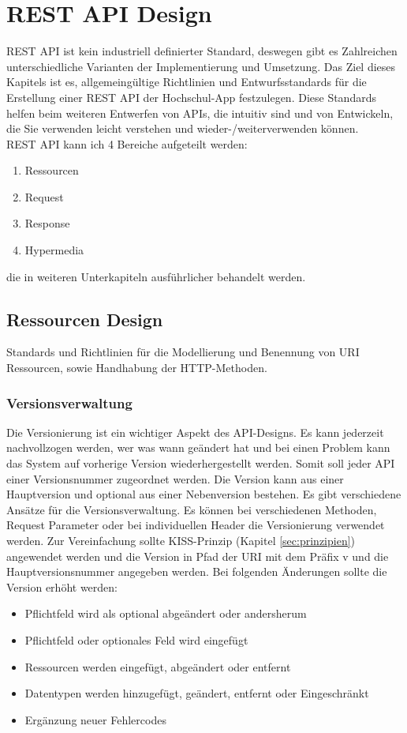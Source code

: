 \section{REST API Design}
\label{sec:ms}
REST API ist kein industriell definierter Standard, deswegen gibt es Zahlreichen unterschiedliche Varianten der Implementierung und Umsetzung. Das Ziel dieses Kapitels ist es, allgemeingültige Richtlinien und Entwurfsstandards für die Erstellung einer REST API der Hochschul-App festzulegen. Diese Standards helfen beim weiteren Entwerfen von APIs, die intuitiv sind und von Entwickeln, die Sie verwenden leicht verstehen und wieder-/weiterverwenden können.\\

REST API kann ich 4 Bereiche aufgeteilt werden: 
\begin{enumerate}
\item Ressourcen
\item Request
\item Response
\item Hypermedia
\end{enumerate}
die in weiteren Unterkapiteln ausführlicher behandelt werden.

\subsection{Ressourcen Design}
Standards und Richtlinien für die Modellierung und Benennung von URI Ressourcen, sowie Handhabung der HTTP-Methoden.

\subsubsection{Versionsverwaltung}
Die Versionierung ist ein wichtiger Aspekt des API-Designs. Es kann jederzeit nachvollzogen werden, wer was wann geändert hat und bei einen Problem kann das System auf vorherige Version wiederhergestellt werden. Somit soll jeder API einer Versionsnummer zugeordnet werden. Die Version kann aus einer Hauptversion und optional aus einer Nebenversion bestehen. Es gibt verschiedene Ansätze für die Versionsverwaltung. Es können bei verschiedenen Methoden, Request Parameter oder bei individuellen Header die Versionierung verwendet werden. Zur Vereinfachung sollte KISS-Prinzip (Kapitel \ref{sec:prinzipien}) angewendet werden und die Version in Pfad der URI mit dem Präfix \glqq v\grqq{} und die Hauptversionsnummer angegeben werden. Bei folgenden Änderungen sollte die Version erhöht werden:
\begin{itemize}
\item Pflichtfeld wird als optional abgeändert oder andersherum
\item Pflichtfeld oder optionales Feld wird eingefügt
\item Ressourcen werden eingefügt, abgeändert oder entfernt
\item Datentypen werden hinzugefügt, geändert, entfernt oder Eingeschränkt
\item Ergänzung neuer Fehlercodes
\end{itemize}

